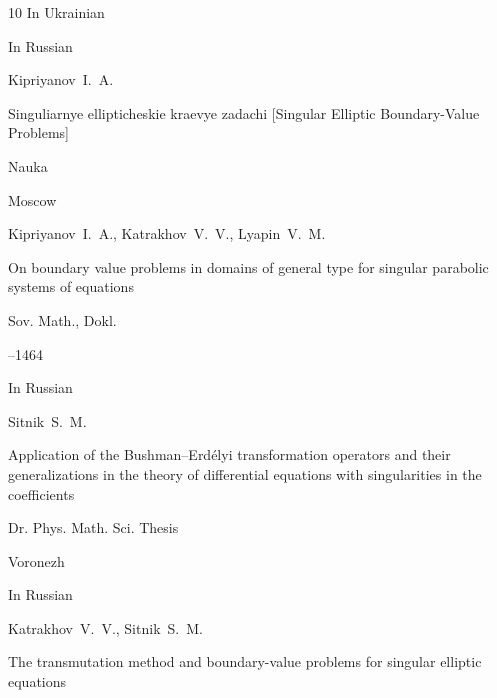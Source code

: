 \begin{thebibliography}{10}
\lang In Ukrainian






\lang In Russian

\by Kipriyanov~I.~A.

\book  Singuliarnye ellipticheskie kraevye zadachi \rm [Singular Elliptic Boundary-Value Problems]


\publ Nauka

\publaddr Moscow





\by Kipriyanov~I.~A., Katrakhov~V.~V., Lyapin~V.~M.

\paper On boundary value problems in domains of general type for singular parabolic systems of equations

\jour Sov. Math., Dokl. 



--1464 








\lang In Russian

\by Sitnik~S.~M. 

\thesis Application of the Bushman--Erd\'elyi transformation operators and their generalizations in the theory of differential equations with singularities in the coefficients

\thesisinfo Dr. Phys. Math. Sci. Thesis


\publaddr Voronezh









\lang In Russian

\by Katrakhov~V.~V., Sitnik~S.~M.

\paper The transmutation method and boundary-value problems for singular elliptic equations


\end{thebibliography}
